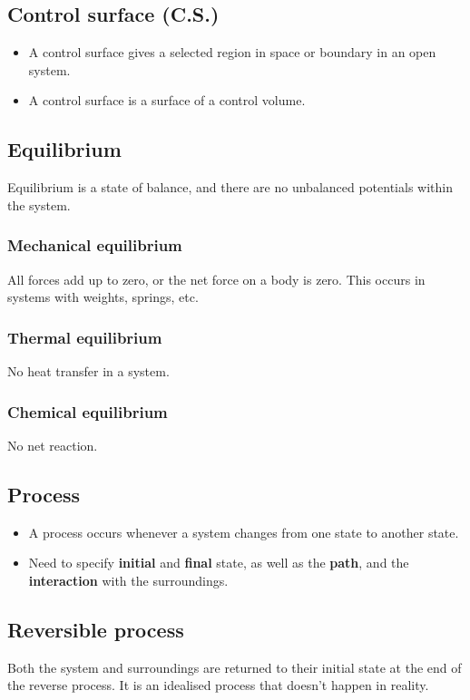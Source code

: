 \documentclass[11pt]{article}
\begin{document}
\subsection{Control surface (C.S.)}
\label{sec:org08162b1}
\begin{itemize}
\item A control surface gives a selected region in space or boundary in an open system.
\item A control surface is a surface of a control volume.
\end{itemize}
\subsection{Equilibrium}
\label{sec:org82ce6b0}
Equilibrium is a state of balance, and there are no unbalanced potentials within the system.
\subsubsection{Mechanical equilibrium}
\label{sec:org69543bb}
All forces add up to zero, or the net force on a body is zero. This occurs in systems with weights, springs, etc.
\subsubsection{Thermal equilibrium}
\label{sec:org731d497}
No heat transfer in a system.
\subsubsection{Chemical equilibrium}
\label{sec:orgd6ae5df}
No net reaction.
\subsection{Process}
\label{sec:orgfa8a68d}
\begin{itemize}
\item A process occurs whenever a system changes from one state to another state.
\item Need to specify \textbf{initial} and \textbf{final} state, as well as the \textbf{path}, and the \textbf{interaction} with the surroundings.
\end{itemize}
\subsection{Reversible process}
\label{sec:orgff86d54}
Both the system and surroundings are returned to their initial state at the end of the reverse process. It is an idealised process that doesn't happen in reality.
\end{document}
